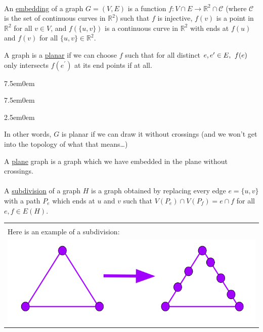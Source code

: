 \documentclass{book}
\newcommand{\teachComment}{
   \color{Orange}%
   \fontsize{12}{14}\selectfont%
}
\newcommand{\exOne}{%
   \color{Purple}%
   \fontsize{14}{16}\selectfont%
}
\newenvironment{myIndent}{%
   \begin{adjustwidth}{2.5em}{0em}%
}{%
   \end{adjustwidth}%
}
\newenvironment{myTindent}{%
   \begin{adjustwidth}{7.5em}{0em}%
}{%
   \end{adjustwidth}%
}
\newcommand{\udefine}[1]{{%
   \setulcolor{Red}%
   \setul{0.14em}{0.07em}%
   \ul{#1}%
}}
\newcommand{\mySepOne}[1][.]{%
   {\noindent\color{#1}{\rule{6.5in}{1mm}}}\\%
}
\newcommand{\mySepTwo}[1][.]{%
   {\noindent\color{#1}{\rule{6.5in}{0.5mm}}}\\%
}
\newenvironment{myClosureOne}[2][.]{%
   \color{#1}%
   \begin{tabular}{|p{#2in}|} \hline \\%
}{%
   \\ \hline \end{tabular}%
}
\newcommand{\retTwo}{\hfill\bigbreak}
\begin{document}
\mySepOne

An \udefine{embedding} of a graph $G = (V, E)$ is a function $f: V\cap E\longrightarrow \mathbb{R}^2 \cap \mathcal{C}$ (where $\mathcal{C}$ is the set of continuous curves in $\mathbb{R}^2$) such that $f$ is injective, $f(v)$ is a point in $\mathbb{R}^2$ for all $v \in V$, and $f(\{u, v\})$ is a continuous curve in $\mathbb{R}^2$ with ends at $f(u)$ and $f(v)$ for all $\{u, v\} \in \mathbb{R}^2$. \retTwo

A graph is a \udefine{planar} if we can choose $f$ such that for all distinct $e, e^\prime \in E, \hspace{0.4em} f(e)$ only intersects  $f(e^\prime)$ at its end points if at all.
{\begin{myTindent}\begin{myTindent}\begin{myIndent} \teachComment
   In other words, $G$ is planar if we can draw it without crossings (and we won't get into the topology of what that means\dots) \retTwo
\end{myIndent}\end{myTindent}\end{myTindent}}

A \udefine{plane} graph is a graph which we have embedded in the plane without crossings.\\ 

\mySepTwo

A \udefine{subdivision} of a graph $H$ is a graph obtained by replacing every edge $e = \{u, v\}$ with a path $P_e$ which ends at $u$ and $v$ such that $V(P_e) \cap V(P_f) = e \cap f$ for all $e, f \in E(H)$.

{\begin{center} \exOne
   {\begin{myClosureOne}{3.7}
      Here is an example of a subdivision:\\
      \includegraphics[scale=0.75]{Subdivision_Image.png}
   \end{myClosureOne}}
\end{center}}
\end{document}
